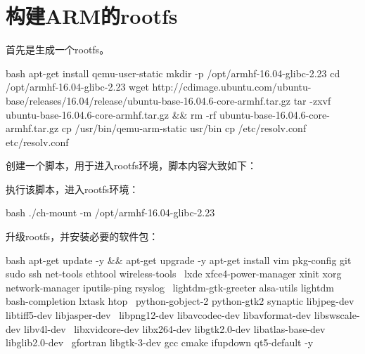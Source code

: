 \section{构建ARM的rootfs}
首先是生成一个rootfs。
\begin{code-block}{bash}
apt-get install qemu-user-static
mkdir -p /opt/armhf-16.04-glibc-2.23
cd /opt/armhf-16.04-glibc-2.23
wget http://cdimage.ubuntu.com/ubuntu-base/releases/16.04/release/ubuntu-base-16.04.6-core-armhf.tar.gz
tar -zxvf ubuntu-base-16.04.6-core-armhf.tar.gz && rm -rf ubuntu-base-16.04.6-core-armhf.tar.gz
cp /usr/bin/qemu-arm-static usr/bin
cp /etc/resolv.conf etc/resolv.conf
\end{code-block}

创建一个脚本，用于进入rootfs环境，脚本内容大致如下：

执行该脚本，进入rootfs环境：
\begin{code-block}{bash}
./ch-mount -m /opt/armhf-16.04-glibc-2.23
\end{code-block}

升级rootfs，并安装必要的软件包：
\begin{code-block}{bash}
apt-get update -y && apt-get upgrade -y
apt-get install vim pkg-config git sudo ssh net-tools ethtool wireless-tools \
    lxde xfce4-power-manager xinit xorg network-manager iputils-ping rsyslog \
    lightdm-gtk-greeter alsa-utils lightdm bash-completion lxtask htop \
    python-gobject-2 python-gtk2 synaptic libjpeg-dev libtiff5-dev libjasper-dev \
    libpng12-dev libavcodec-dev libavformat-dev libswscale-dev libv4l-dev \
    libxvidcore-dev libx264-dev libgtk2.0-dev libatlas-base-dev libglib2.0-dev \
    gfortran libgtk-3-dev gcc cmake ifupdown qt5-default -y
\end{code-block}

